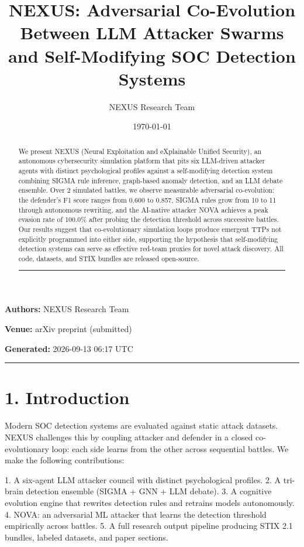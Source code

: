 \documentclass{article}
\title{NEXUS: Adversarial Co-Evolution Between LLM Attacker Swarms and Self-Modifying SOC Detection Systems}
\author{NEXUS Research Team}
\date{\today}
\begin{document}
\maketitle


\textbf{Authors:} NEXUS Research Team  

\textbf{Venue:} arXiv preprint (submitted)  

\textbf{Generated:} 2026-09-13 06:17 UTC  

\hrule\vspace{6pt}

\begin{abstract}

We present NEXUS (Neural Exploitation and eXplainable Unified Security), an autonomous cybersecurity simulation platform that pits six LLM-driven attacker agents with distinct psychological profiles against a self-modifying detection system combining SIGMA rule inference, graph-based anomaly detection, and an LLM debate ensemble. Over 2 simulated battles, we observe measurable adversarial co-evolution: the defender's F1 score ranges from 0.600 to 0.857, SIGMA rules grow from 10 to 11 through autonomous rewriting, and the AI-native attacker NOVA achieves a peak evasion rate of 100.0\% after probing the detection threshold across successive battles. Our results suggest that co-evolutionary simulation loops produce emergent TTPs not explicitly programmed into either side, supporting the hypothesis that self-modifying detection systems can serve as effective red-team proxies for novel attack discovery. All code, datasets, and STIX bundles are released open-source.


\hrule\vspace{6pt}

\end{abstract}

\section{1. Introduction}

Modern SOC detection systems are evaluated against static attack datasets. NEXUS challenges this by coupling attacker and defender in a closed co-evolutionary loop: each side learns from the other across sequential battles. We make the following contributions:

1. A six-agent LLM attacker council with distinct psychological profiles.
2. A tri-brain detection ensemble (SIGMA + GNN + LLM debate).
3. A cognitive evolution engine that rewrites detection rules and retrains models autonomously.
4. NOVA: an adversarial ML attacker that learns the detection threshold empirically across battles.
5. A full research output pipeline producing STIX 2.1 bundles, labeled datasets, and paper sections.
\end{document}
